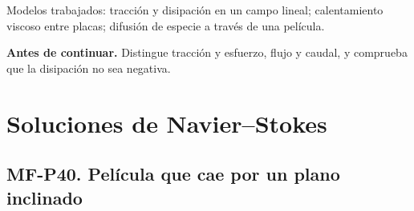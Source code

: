 \begin{tcolorbox}[studiumcheck,breakable=false,title={Síntesis y comprobación}]Modelos trabajados: tracción y disipación en un campo lineal; calentamiento viscoso entre placas; difusión de especie a través de una película.\par\textbf{Antes de continuar.} Distingue tracción y esfuerzo, flujo y caudal, y comprueba que la disipación no sea negativa.\end{tcolorbox}

\chapter{Soluciones de Navier--Stokes}


\Needspace{.30\textheight}\section{MF-P40. Película que cae por un plano inclinado}

